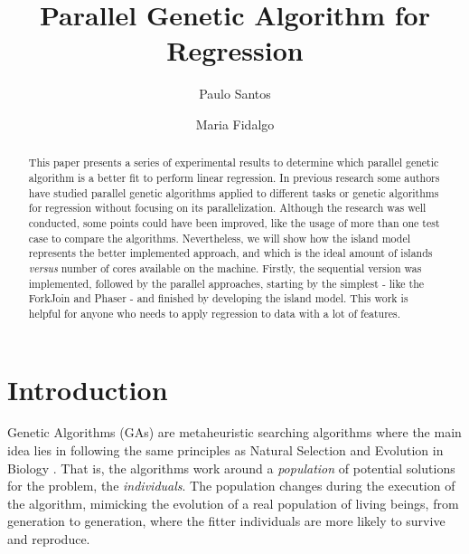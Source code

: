 \documentclass[runningheads]{llncs}
\begin{document}
\title{Parallel Genetic Algorithm for Regression}

\author{Paulo Santos \and
Maria Fidalgo
}


\maketitle

\begin{abstract}
This paper presents a series of experimental results to determine which parallel genetic algorithm is a better fit to perform linear regression. In previous research some authors have studied parallel genetic algorithms applied to different tasks or genetic algorithms for regression without focusing on its parallelization. Although the research was well conducted, some points could have been improved, like the usage of more than one test case to compare the algorithms. Nevertheless, we will show how the island model represents the better implemented approach, and which is the ideal amount of islands \textit{versus} number of cores available on the machine. Firstly, the sequential version was implemented, followed by the parallel approaches, starting by the simplest - like the ForkJoin and Phaser - and finished by developing the island model. This work is helpful for anyone who needs to apply regression to data with a lot of features.

\end{abstract}


\section{Introduction}

Genetic Algorithms (GAs) are metaheuristic searching algorithms where the main idea lies in following the same principles as Natural Selection and Evolution in Biology \cite{sivanandam2008genetic}. That is, the algorithms work around a \textit{population} of potential solutions for the problem, the \textit{individuals}. The population changes during the execution of the algorithm, mimicking the evolution of a real population of living beings, from generation to generation, where the fitter individuals are more likely to survive and reproduce.
\end{document}
